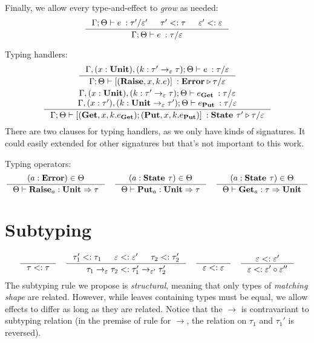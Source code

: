 \documentclass[declaration,shortabstract]{iithesis}
\theoremstyle{definition} \newtheorem{definition}{Definition}[section]
\newcommand{\types}[4][\Gamma;\Theta]{\ensuremath{{{#1} \vdash {#2} \: : {#3}/{#4}}}}
\newcommand{\arrow}[3]{{#1}\rightarrow_{#2}{#3}}
\newcommand{\optypes}[5][\Theta]{\ensuremath{{#1}\vdash{#2}_{#3} : {#4} \Rightarrow {#5}}}
\begin{document}
Finally, we allow every type-and-effect to \textit{grow} as needed:
$$
\inference{
    \types{e}{\tau'}{\varepsilon'} & \tau' <: \tau & \varepsilon' <: \varepsilon
}{
    \types{e}{\tau}{\varepsilon}
}
$$

Typing handlers:
\begin{gather*}
\begin{gathered}
\inference{
    \types[\Gamma,(x:\textbf{Unit}), (k:\arrow{\tau'}{\varepsilon}{\tau});\Theta]{e}{\tau}{\varepsilon}
}{ 
    \types{ [(\textbf{Raise}, x, k. e)]}{\textbf{Error}\triangleright \tau}{\varepsilon}
}
\\
\inference{
\types[\Gamma,(x:\textbf{Unit}), (k:\arrow{\tau'}{\varepsilon}{\tau});\Theta]{e_\textbf{Get}}{\tau}{\varepsilon} \\
\types[\Gamma,(x:\tau'),(k:\arrow{\textbf{Unit}}{\varepsilon}{\tau'});\Theta]{e_\textbf{Put}}{\tau}{\varepsilon} 
}{
\types{ [(\textbf{Get}, x, k. e_\textbf{Get});(\textbf{Put}, x, k. e_\textbf{Put})]}{\textbf{State }\tau'\triangleright \tau}{\varepsilon} 
}
\end{gathered}
\end{gather*}
There are two clauses for typing handlers, as we only have kinds of signatures. It could easily extended for other signatures but that's not important to this work.

Typing operators:
\begin{gather*}
\begin{gathered}
\inference{
    (a : \textbf{Error}) \in \Theta
}{
    \optypes{\textbf{Raise}}{a}{\textbf{Unit}}{\tau}
}
\quad 
\inference{
    (a : \textbf{State }\tau) \in \Theta
}{
    \optypes{\textbf{Put}}{a}{\textbf{Unit}}{\tau}
}
\quad 
\inference{
    (a : \textbf{State }\tau) \in \Theta
}{
    \optypes{\textbf{Get}}{a}{\tau}{\textbf{Unit}}
}
\end{gathered}
\end{gather*}

\section{Subtyping}
\begin{gather*}
\begin{gathered}
\inference{}{\tau <: \tau}
\quad
\inference{
    \tau_1' <: \tau_1 & \varepsilon <: \varepsilon' & \tau_2 <: \tau_2'
}{
    \arrow{\tau_1}{\varepsilon}{\tau_2} <: \arrow{\tau_1'}{\varepsilon'}{\tau_2'}
} 
\quad
\inference{}{\varepsilon <: \varepsilon}
\quad
\inference{
    \varepsilon <: \varepsilon'
}{
    \varepsilon <: \varepsilon' \circ \varepsilon''
}
\end{gathered}
\end{gather*}
\setlength{\jot}{3pt}
The subtyping rule we propose is \textit{structural}, meaning that only types of
\textit{matching shape} are related.
However, while leaves containing types must be equal, we allow effects to differ as long as they are related.
Notice that the $\rightarrow$ is contravariant to subtyping relation
(in the premise of rule for $\rightarrow$, the relation on $\tau_1$ and $\tau_1'$ is reversed).
\end{document}

